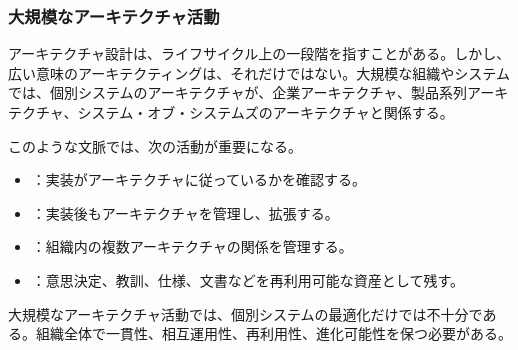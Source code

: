 \subsubsection{大規模なアーキテクチャ活動}
アーキテクチャ設計は、ライフサイクル上の一段階を指すことがある。しかし、広い意味のアーキテクティングは、それだけではない。大規模な組織やシステムでは、個別システムのアーキテクチャが、企業アーキテクチャ、製品系列アーキテクチャ、システム・オブ・システムズのアーキテクチャと関係する。

このような文脈では、次の活動が重要になる。
\begin{itemize}
  \item {}：実装がアーキテクチャに従っているかを確認する。
  \item {}：実装後もアーキテクチャを管理し、拡張する。
  \item {}：組織内の複数アーキテクチャの関係を管理する。
  \item {}：意思決定、教訓、仕様、文書などを再利用可能な資産として残す。
\end{itemize}

大規模なアーキテクチャ活動では、個別システムの最適化だけでは不十分である。組織全体で一貫性、相互運用性、再利用性、進化可能性を保つ必要がある。
